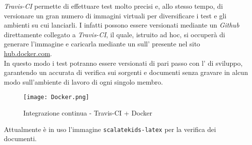\documentclass{scalatekids-article}
\begin{document}
\textit{Travis-CI} permette di effettuare test molto precisi e, allo stesso
tempo, di versionare un gran numero di immagini virtuali per diversificare i test e
gli ambienti su cui lanciarli. I  infatti possono essere
versionati mediante un  \textit{Github} direttamente collegato a
\textit{Travis-CI}, il quale, istruito ad hoc, si occuperà di generare
l'immagine  e caricarla mediante un  sull'
 presente nel sito \url{hub.docker.com}.\\ In questo modo i test
potranno essere versionati di pari passo con l' di sviluppo, garantendo
un accurata  di verifica sui sorgenti e documenti senza gravare in alcun
modo sull'ambiente di lavoro di ogni singolo membro.
\begin{figure}[H]
  \centering
  \texttt{[image: Docker.png]}
  \caption{Integrazione continua - Travis-CI + Docker}
\end{figure}
Attualmente è in uso l'immagine \verb=scalatekids-latex= per la verifica dei documenti.
\end{document}
